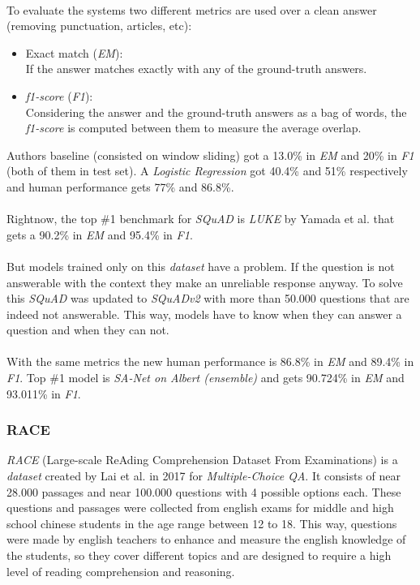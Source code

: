 \paragraph{}
To evaluate the systems two different metrics are used over a clean answer (removing punctuation, articles, etc):
\begin{itemize}
	\item Exact match (\emph{EM}): \\
		If the answer matches exactly with any of the ground-truth answers.
	\item \emph{f1-score} (\emph{F1}): \\
		Considering the answer and the ground-truth answers as a bag of words, the \emph{f1-score} is computed between them to measure the average overlap.
\end{itemize}
Authors baseline\cite{Rajpurkar2016} (consisted on window sliding) got a 13.0\% in \emph{EM} and 20\% in \emph{F1} (both of them in test set). A \emph{Logistic Regression} got 40.4\% and 51\% respectively and human performance gets 77\% and 86.8\%.
\paragraph{}
Rightnow, the top \#1 benchmark for \emph{SQuAD} is \emph{LUKE}\cite{Yamada2020} by Yamada et al. that gets a 90.2\% in \emph{EM} and 95.4\% in \emph{F1}.
\paragraph{}
But models trained only on this \emph{dataset} have a problem. If the question is not answerable with the context they make an unreliable response anyway. To solve this \emph{SQuAD} was updated to \emph{SQuADv2}\cite{Rajpurkar2018} with more than 50.000 questions that are indeed not answerable. This way, models have to know when they can answer a question and when they can not.
\paragraph{}
With the same metrics the new human performance is 86.8\% in \emph{EM} and 89.4\% in \emph{F1}. Top \#1 model is \emph{SA-Net on Albert (ensemble)} and gets 90.724\% in \emph{EM} and 93.011\% in \emph{F1}.
\subsubsection{RACE}
\label{sec:race}
\emph{RACE} (Large-scale ReAding Comprehension Dataset From Examinations)\cite{Lai2017} is a \emph{dataset} created by Lai et al. in 2017 for \emph{Multiple-Choice QA}. It consists of near 28.000 passages and near 100.000 questions with 4 possible options each. These questions and passages were collected from english exams for middle and high school chinese students in the age range between 12 to 18. This way, questions were made by english teachers to enhance and measure the english knowledge of the students, so they cover different topics and are designed to require a high level of reading comprehension and reasoning. 
